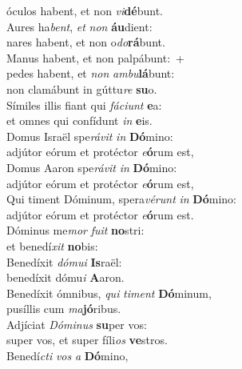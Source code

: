 \oddverse óculos habent, et non \textit{vi}\textbf{dé}bunt.\\
\evenverse Aures ha\textit{bent}, \textit{et} \textit{non} \textbf{áu}dient:~\*\\
\evenverse nares habent, et non o\textit{do}\textbf{rá}bunt.\\
\oddverse Manus habent, et non palpábunt:~+\\
\oddverse  pedes habent, et \textit{non} \textit{am}\textit{bu}\textbf{lá}bunt:~\*\\
\oddverse non clamábunt in gúttu\textit{re} \textbf{su}o.\\
\evenverse Símiles illis fiant qui \textit{fá}\textit{ci}\textit{unt} \textbf{e}a:~\*\\
\evenverse et omnes qui confídunt \textit{in} \textbf{e}is.\\
\oddverse Domus Israël spe\textit{rá}\textit{vit} \textit{in} \textbf{Dó}mino:~\*\\
\oddverse adjútor eórum et protéctor \textit{e}\textbf{ó}rum est,\\
\evenverse Domus Aaron spe\textit{rá}\textit{vit} \textit{in} \textbf{Dó}mino:~\*\\
\evenverse adjútor eórum et protéctor \textit{e}\textbf{ó}rum est,\\
\oddverse Qui timent Dóminum, spera\textit{vé}\textit{runt} \textit{in} \textbf{Dó}mino:~\*\\
\oddverse adjútor eórum et protéctor \textit{e}\textbf{ó}rum est.\\
\evenverse Dóminus me\textit{mor} \textit{fu}\textit{it} \textbf{no}stri:~\*\\
\evenverse et benedí\textit{xit} \textbf{no}bis:\\
\oddverse Benedíxit \textit{dó}\textit{mu}\textit{i} \textbf{Is}raël:~\*\\
\oddverse benedíxit dómu\textit{i} \textbf{A}aron.\\
\evenverse Benedíxit ómnibus, \textit{qui} \textit{ti}\textit{ment} \textbf{Dó}minum,~\*\\
\evenverse pusíllis cum \textit{ma}\textbf{jó}ribus.\\
\oddverse Adjíciat \textit{Dó}\textit{mi}\textit{nus} \textbf{su}per vos:~\*\\
\oddverse super vos, et super fíli\textit{os} \textbf{ve}stros.\\
\evenverse Benedí\textit{cti} \textit{vos} \textit{a} \textbf{Dó}mino,~\*\\
